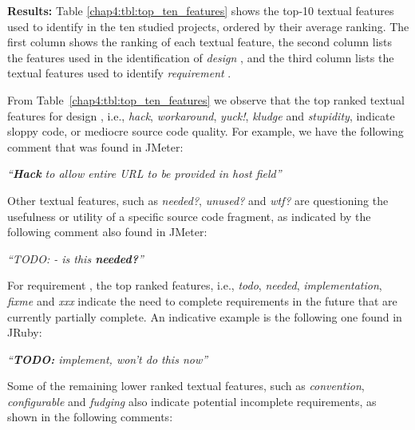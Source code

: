 \noindent \textbf{Results:} Table \ref{chap4:tbl:top_ten_features} shows the top-10 textual features used to identify  \SATD in the ten studied projects, ordered by their average ranking. The first column shows the ranking of each textual feature, the second column lists the features used in the identification of \emph{design} \SATD, and the third column lists the textual features used to identify \emph{requirement} \SATD.

From Table~\ref{chap4:tbl:top_ten_features} we observe that the top ranked textual features for design \SATD, i.e., \textit{hack}, \textit{workaround}, \textit{yuck!}, \textit{kludge} and \textit{stupidity}, indicate sloppy code, or mediocre source code quality. For example, we have the following comment that was found in JMeter:

\vspace{1mm}
\begin{displayquote}
\textit{``\textbf{Hack} to allow entire URL to be provided in host field''}
\end{displayquote}
\vspace{1mm}

Other textual features, such as \textit{needed?}, \textit{unused?} and \textit{wtf?} are questioning the usefulness or utility of a specific source code fragment, as indicated by the following comment also found in JMeter:

\vspace{1mm}
\begin{displayquote}
\textit{``TODO: - is this \textbf{needed?}''}
\end{displayquote}
\vspace{1mm}

For requirement \SATD, the top ranked features, i.e., \textit{todo}, \textit{needed}, \textit{implementation}, \textit{fixme} and \textit{xxx} indicate the need to complete requirements in the future that are currently partially complete. An indicative example is the following one found in JRuby:

\vspace{1mm}
\begin{displayquote}
\textit{``\textbf{TODO:} implement, won't do this now''}
\end{displayquote}
\vspace{1mm}

Some of the remaining lower ranked textual features, such as \textit{convention}, \textit{configurable} and \textit{fudging} also indicate potential incomplete requirements, as shown in the following comments:

